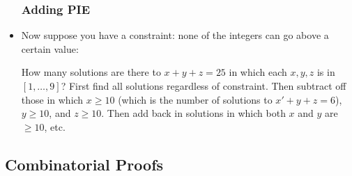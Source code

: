 \begin{itemize}
  \subsubsection*{Adding PIE}
  \item Now suppose you have a constraint: none of the integers can go above a certain value:
  
  \ex How many solutions are there to $x + y + z = 25$ in which each $x, y, z$ is in $[1,\ldots,9]$?  First find all solutions regardless of constraint.  Then subtract off those in which $x \ge 10$ (which is the number of solutions to $x' + y + z = 6$), $y \ge 10$, and $z \ge 10$.  Then add back in solutions in which both $x$ and $y$ are $\ge 10$, etc.
\end{itemize}

\subsection*{Combinatorial Proofs}

